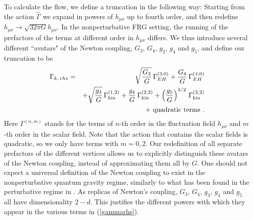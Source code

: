 \documentclass[twocolumn,prd,superscriptaddress,preprintnumbers,amsmath,amssymb,nofootinbib]{revtex4}
\newcommand{\bea}{\begin{eqnarray}}
\newcommand{\eea}{\end{eqnarray}}
\begin{document}
To calculate the flow, we define a truncation in the following way: Starting from the action $\hat{\Gamma}$ we expand in powers of $h_{\mu \nu}$ up to fourth order, and then redefine $h_{\mu \nu} \rightarrow \sqrt{32 \pi G} h_{\mu\nu}$. In the nonperturbative FRG setting, the running of the prefactors of the terms at different order in $h_{\mu \nu}$ differs. We thus introduce several different ``avatars" of the Newton coupling, $G_3$, $G_4$, $g_3$, $g_4$ and $g_5$, and define our truncation to be
\bea
\label{gammarhs}
\Gamma_{k, \, rhs}&=&  \sqrt{\frac{G_3}{G}} \, \Gamma_{EH}^{(3,0)} + \frac{G_4}{G} \, \Gamma_{EH}^{(4,0)}\nonumber\\
&{}& + \sqrt{\frac{g_3}{G}} \, \Gamma_{\rm kin}^{(1,2)} + \frac{g_4}{ G} \, \Gamma_{\rm kin}^{(2,2)} + \left(\frac{g_5}{ G}\right)^{3/2} \, \Gamma_{\rm kin}^{(3,2)}\nonumber\\
&{}& + \mbox{ quadratic terms }.
\eea
Here $\Gamma^{(n,m)}$ stands for the terms of $n$-th order in the fluctuation field $h_{\mu \nu}$ 
and $m$-th order in the scalar field. 
Note that the action that contains the scalar fields is quadratic, so we only have terms with $m=0,2$.  Our redefinition of all separate prefactors of the different vertices allows us to explicitly distinguish these avatars of the Newton coupling, instead of approximating them all by $G$.  One should not expect a universal definition of the Newton coupling to exist in the nonperturbative quantum gravity regime, similarly to what has been found in the perturbative regime in \cite{Anber:2011ut}.
As replicas of Newton's coupling, $G_3$, $G_4$, $g_3$, $g_4$ and $g_5$ all have dimensionality $2-d$.
This justifies the different powers with which they appear
in the various terms in (\ref{gammarhs}).
\end{document}
